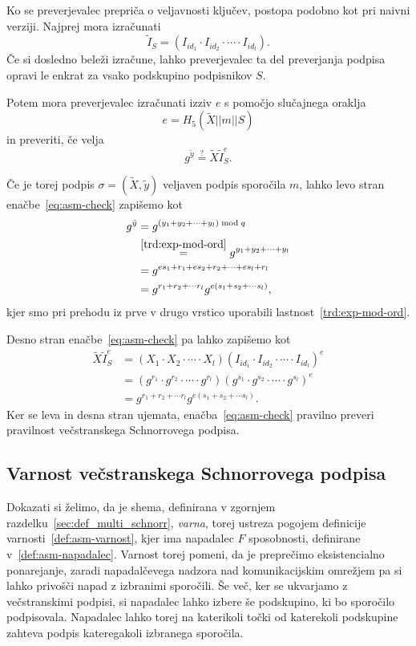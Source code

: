 Ko se preverjevalec prepriča o veljavnosti ključev, postopa podobno kot pri naivni verziji. Najprej
mora izračunati
$$
\tilde{I}_S = (I_{id_1} \cdot I_{id_2} \cdot \cdots \cdot I_{id_l}).
$$
Če si dosledno beleži izračune, lahko preverjevalec ta del preverjanja podpisa opravi le enkrat za
vsako podskupino podpisnikov $S$.

Potem mora preverjevalec izračunati izziv $e$ s pomočjo slučajnega oraklja
$$
e = H_5(\tilde{X} || m || S)
$$
in preveriti, če velja
\begin{equation}
\label{eq:asm-check}
g^{\tilde{y}} \stackrel{?}{=} \tilde{X} \tilde{I}_S^e.
\end{equation}

Če je torej podpis $\sigma = (\tilde{X}, \tilde{y})$ veljaven podpis sporočila $m$, lahko levo stran
enačbe~\eqref{eq:asm-check} zapišemo kot
\begin{align*}
    g^{\tilde{y}} &= g^{(y_1 + y_2 + \cdots + y_l) \bmod q} \\
                  &\stackrel{\ref{trd:exp-mod-ord}}{=} g^{y_1 + y_2 + \cdots + y_l} \\
                  &= g^{e s_1 + r_1 + e s_2 + r_2 + \cdots + e s_l + r_l} \\
                  &= g^{r_1 + r_2 + \cdots r_l} g^{e (s_1 + s_2 + \cdots s_l)},
\end{align*}
kjer smo pri prehodu iz prve v drugo vrstico uporabili lastnost~\ref{trd:exp-mod-ord}.

Desno stran enačbe~\eqref{eq:asm-check} pa lahko zapišemo kot
\begin{align*}
    \tilde{X} \tilde{I}_S^e &= (X_1 \cdot X_2 \cdot \cdots \cdot X_l)
        (I_{id_1} \cdot I_{id_2} \cdot \cdots \cdot I_{id_l})^e \\
    &=(g^{r_1} \cdot g^{r_2} \cdot \cdots \cdot g^{r_l})
        (g^{s_1} \cdot g^{s_2} \cdot \cdots \cdot g^{s_l})^e \\
    &= g^{r_1 + r_2 + \cdots r_l} g^{e (s_1 + s_2 + \cdots s_l)}.
\end{align*}
Ker se leva in desna stran ujemata, enačba~\eqref{eq:asm-check} pravilno preveri pravilnost večstranskega
Schnorrovega podpisa.

\subsection{Varnost večstranskega Schnorrovega podpisa}
\label{sec:proof_multi_schnorr}
Dokazati si želimo, da je shema, definirana v zgornjem razdelku~\ref{sec:def_multi_schnorr}, \textit{varna},
torej ustreza pogojem definicije varnosti~\ref{def:asm-varnost}, kjer ima napadalec $F$ sposobnosti,
definirane v~\ref{def:asm-napadalec}. Varnost torej pomeni, da je preprečimo eksistencialno ponarejanje,
zaradi napadalčevega nadzora nad komunikacijskim omrežjem pa si lahko privošči napad z izbranimi sporočili.
Še več, ker se ukvarjamo z večstranskimi podpisi, si napadalec lahko izbere še podskupino, ki bo 
sporočilo podpisovala. Napadalec lahko torej na katerikoli točki od katerekoli podskupine zahteva
podpis kateregakoli izbranega sporočila.

